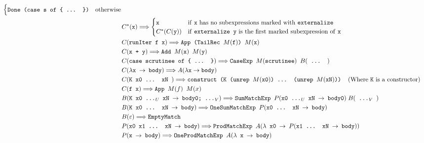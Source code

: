 \documentclass[sigplan,anonymous,review]{acmart}
\newcommand{\expr}[1]{(#1)} %
\newcommand{\rarr}{\rightarrow}
\newcommand{\rewrites}{\Longrightarrow}
\newcommand{\ttt}{\texttt}
\begin{document}
\begin{figure}[hp]
\begin{align*}
\begin{cases}
        \ttt{Done (case s of \{ ... \})} & \text{otherwise}
      \end{cases}\\
  &C^{*}\expr{\ttt{x}} \rewrites
    \begin{cases}
      \ttt{x} & \text{if \ttt{x} has no subexpressions marked with \ttt{externalize}}\\
      C^{*}\expr{C\expr{\ttt{y}}} & \text{if \ttt{externalize y} is the first marked subexpression of \ttt{x}}\\
    \end{cases}\\
  &C\expr{\ttt{runIter f x}} \rewrites \ttt{App (TailRec $M\expr{\ttt{f}}$) $M\expr{\ttt{x}}$}\\
  &C\expr{\ttt{x + y}} \rewrites \ttt{Add $M\expr{\ttt{x}}$ $M\expr{\ttt{y}}$}\\
  &C\expr{\ttt{case scrutinee of \{ ... \}}} \rewrites \ttt{CaseExp $M\expr{\ttt{scrutinee}}$ } B\expr{\ttt{ ... }}\\
  &C\expr{\ttt{$\lambda$x $\rarr$ body}} \rewrites A\expr{\lambda \ttt{x} \rarr \ttt{body}}\\
  &C\expr{\ttt{K x0 ... xN }} \rewrites \ttt{construct (K (unrep $M\expr{\ttt{x0}}$) ... (unrep $M\expr{\ttt{xN}}$))}\;\;\;\;\text{(Where \ttt{K} is a constructor)}\\
  &C\expr{\ttt{f x}} \rewrites \ttt{App $M\expr{f}$ $M\expr{x}$}\\
  &B\expr{\ttt{K x0 ...$_U$ xN $\rarr$ body0; ...$_V$}} \rewrites \ttt{SumMatchExp }P\expr{\ttt{x0 ...$_U$ xN $\rarr$ body0}}\; B\expr{\ttt{ ...$_V$ }}\\
  &B\expr{\ttt{K x0 ... xN $\rarr$ body}} \rewrites \ttt{OneSumMatchExp }P\expr{\ttt{x0 ... xN $\rarr$ body}}\\
  &B\expr{\ttt{$\varepsilon$}} \rewrites \ttt{EmptyMatch}\\
  &P\expr{\ttt{x0 x1 ... xN $\rarr$ body}} \rewrites \ttt{ProdMatchExp }A\expr{\ttt{$\lambda$ x0 $\rarr$ $P\expr{\ttt{x1 ... xN $\rarr$ body}}$}}\\
  &P\expr{\ttt{x $\rarr$ body}} \rewrites \ttt{OneProdMatchExp }A\expr{\ttt{$\lambda$ x $\rarr$ body}}\\

\end{align*}
\end{figure}
\end{document}
